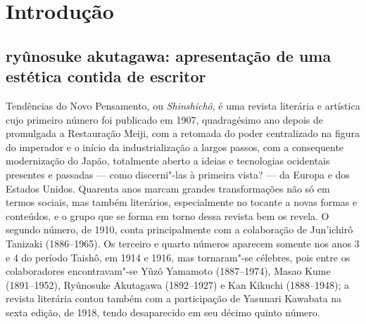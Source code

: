 \chapter[Introdução, por Madalena Hashimoto Cordaro]{Introdução}

\section{ryûnosuke akutagawa: apresentação de uma estética contida de escritor}

Tendências do Novo Pensamento, ou \textit{Shinshichô}, é uma
revista literária e artística cujo primeiro número foi publicado em
1907, quadragésimo ano depois de promulgada a Restauração Meiji, com a
retomada do poder centralizado na figura do imperador e o início da
industrialização a largos passos, com a consequente modernização do
Japão, totalmente aberto a ideias e tecnologias ocidentais presentes e
passadas --- como discerni"-las à primeira vista? --- da Europa e dos
Estados Unidos. Quarenta anos marcam grandes transformações não só em
termos sociais, mas também literários, especialmente no tocante a novas
formas e conteúdos, e o grupo que se forma em torno dessa revista bem
os revela. O segundo número, de 1910, conta principalmente com a
colaboração de Jun'ichirô Tanizaki (1886--1965). Os terceiro e quarto
números aparecem somente nos anos 3 e 4 do período Taishô, em 1914 e
1916, mas tornaram"-se célebres, pois entre os
colaboradores encontravam"-se Yûzô Yamamoto  (1887--1974), Masao Kume 
(1891--1952), Ryûnosuke Akutagawa  (1892--1927) e Kan Kikuchi 
(1888--1948); a revista literária contou também com a participação de
Yasunari Kawabata  na sexta edição, de 1918, tendo desaparecido em seu
décimo quinto número.

